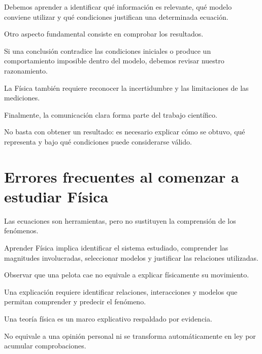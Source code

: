 Debemos aprender a identificar
qué información es relevante,
qué modelo conviene utilizar
y qué condiciones justifican
una determinada ecuación.

Otro aspecto fundamental consiste
en comprobar los resultados.

Si una conclusión contradice
las condiciones iniciales
o produce un comportamiento imposible
dentro del modelo, debemos revisar
nuestro razonamiento.

La Física también requiere reconocer
la incertidumbre y las limitaciones
de las mediciones.

Finalmente, la comunicación clara
forma parte del trabajo científico.

No basta con obtener un resultado:
es necesario explicar cómo se obtuvo,
qué representa y bajo qué condiciones
puede considerarse válido.


\section{Errores frecuentes al comenzar a estudiar Física}

\begin{errorfrecuente}

Las ecuaciones son herramientas,
pero no sustituyen la comprensión
de los fenómenos.

Aprender Física implica identificar
el sistema estudiado, comprender
las magnitudes involucradas,
seleccionar modelos y justificar
las relaciones utilizadas.

\end{errorfrecuente}

\begin{errorfrecuente}

Observar que una pelota cae
no equivale a explicar físicamente
su movimiento.

Una explicación requiere
identificar relaciones, interacciones
y modelos que permitan comprender
y predecir el fenómeno.

\end{errorfrecuente}

\begin{errorfrecuente}

Una teoría física es un marco
explicativo respaldado por evidencia.

No equivale a una opinión personal
ni se transforma automáticamente
en ley por acumular comprobaciones.

\end{errorfrecuente}

